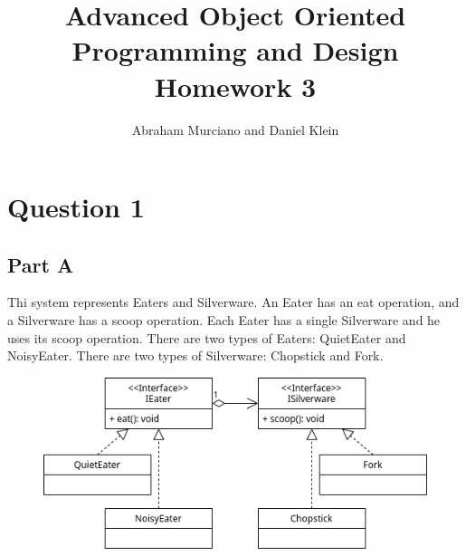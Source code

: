 \documentclass{article}
\title{Advanced Object Oriented Programming and Design\\
\medskip
\large Homework 3}
\author{Abraham Murciano and Daniel Klein}
\begin{document}
\maketitle

\section*{Question 1}

\subsection*{Part A}

Thi system represents Eaters and Silverware. An Eater has an eat operation, and a Silverware has a scoop operation. Each Eater has a single Silverware and he uses its scoop operation. There are two types of Eaters: QuietEater and NoisyEater. There are two types of Silverware: Chopstick and Fork.

\begin{figure}[ht]
	\includegraphics[width=\textwidth]{hw4q1a.png}
\end{figure}
\end{document}
